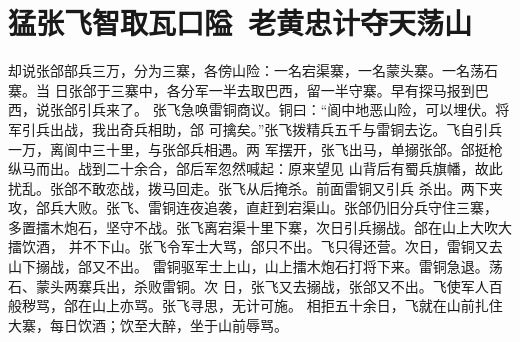 \chapter{猛张飞智取瓦口隘~老黄忠计夺天荡山}

却说张郃部兵三万，分为三寨，各傍山险：一名宕渠寨，一名蒙头寨。一名荡石寨。当
日张郃于三寨中，各分军一半去取巴西，留一半守寨。早有探马报到巴西，说张郃引兵来了。
张飞急唤雷铜商议。铜曰：“阆中地恶山险，可以埋伏。将军引兵出战，我出奇兵相助，郃
可擒矣。”张飞拨精兵五千与雷铜去讫。飞自引兵一万，离阆中三十里，与张郃兵相遇。两
军摆开，张飞出马，单搦张郃。郃挺枪纵马而出。战到二十余合，郃后军忽然喊起：原来望见
山背后有蜀兵旗幡，故此扰乱。张郃不敢恋战，拨马回走。张飞从后掩杀。前面雷铜又引兵
杀出。两下夹攻，郃兵大败。张飞、雷铜连夜追袭，直赶到宕渠山。张郃仍旧分兵守住三寨，
多置擂木炮石，坚守不战。张飞离宕渠十里下寨，次日引兵搦战。郃在山上大吹大擂饮酒，
并不下山。张飞令军士大骂，郃只不出。飞只得还营。次日，雷铜又去山下搦战，郃又不出。
雷铜驱军士上山，山上擂木炮石打将下来。雷铜急退。荡石、蒙头两寨兵出，杀败雷铜。次
日，张飞又去搦战，张郃又不出。飞使军人百般秽骂，郃在山上亦骂。张飞寻思，无计可施。
相拒五十余日，飞就在山前扎住大寨，每日饮酒；饮至大醉，坐于山前辱骂。


